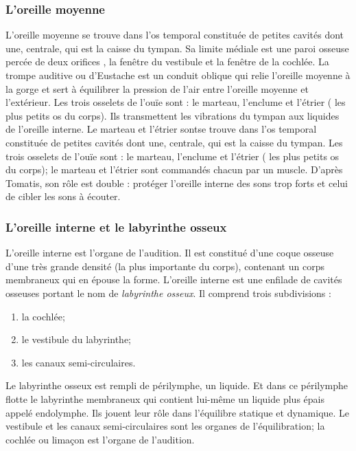 \subsubsection{L'oreille moyenne}

L'oreille moyenne se trouve dans l'os temporal constituée de petites
cavités dont une, centrale, qui est la caisse du tympan. Sa limite
médiale est une paroi osseuse percée de deux orifices , la fenêtre
du vestibule et la fenêtre de la cochlée. La trompe auditive ou d'Eustache
est un conduit oblique qui relie l'oreille moyenne à la gorge et sert
à équilibrer la pression de l'air entre l'oreille moyenne et l'extérieur.
Les trois osselets de l'ouïe sont : le marteau, l'enclume et l'étrier
( les plus petits os du corps). Ils transmettent les vibrations du
tympan aux liquides de l'oreille interne. Le marteau et l'étrier sontse
trouve dans l'os temporal constituée de petites cavités dont une,
centrale, qui est la caisse du tympan. Les trois osselets de l'ouïe
sont : le marteau, l'enclume et l'étrier ( les plus petits os du corps);
le marteau et l'étrier sont commandés chacun par un muscle. D'après
Tomatis, son rôle est double : protéger l'oreille interne des sons
trop forts et celui de cibler les sons à écouter.

\subsubsection{L'oreille interne et le labyrinthe osseux}

L'oreille interne est l'organe de l'audition. Il
est constitué d'une coque osseuse d'une très grande densité (la plus
importante du corps), contenant un corps membraneux qui en épouse
la forme. 
L'oreille interne est une enfilade de cavités osseuses portant 
le nom de \emph{labyrinthe osseux}. Il comprend trois subdivisions : 
\begin{enumerate}
	\item la cochlée;
	\item le vestibule du labyrinthe;
	\item  les canaux semi-circulaires.
\end{enumerate}

Le labyrinthe
osseux est rempli de périlymphe, un liquide. Et dans ce périlymphe
flotte le labyrinthe membraneux qui contient lui-même un liquide
plus épais appelé endolymphe. Ils jouent leur rôle dans l'équilibre
statique et dynamique. Le vestibule et les canaux semi-circulaires
sont les organes de l'équilibration; la cochlée ou
limaçon est l'organe de l'audition. 

